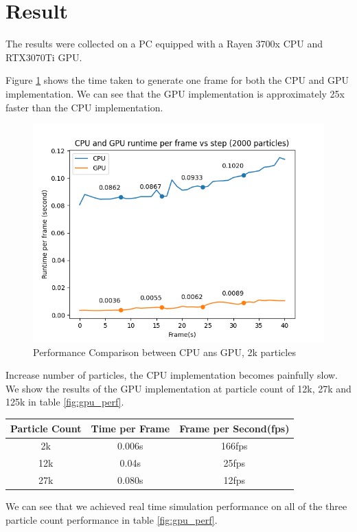 \documentclass[sigconf]{acmart}
\begin{document}
\section{Result}
The results were collected on a PC equipped with a Rayen 3700x CPU and RTX3070Ti GPU.

Figure \ref{fig:perf} shows the time taken to generate one frame for both the CPU and GPU implementation. We can see that the GPU implementation is approximately 25x faster than the CPU implementation.
\begin{figure}
  \centering
  \includegraphics[width=\linewidth]{image/cpu-gpu-comprasion.png}
  \caption{Performance Comparison between CPU ans GPU, 2k particles}
\label{fig:perf}
\end{figure}

Increase number of particles, the CPU implementation becomes painfully slow. We show the results of the GPU implementation at particle count of 12k, 27k and 125k in table \ref{fig:gpu_perf}.
\begin{center}
  \begin{tabular}{| c | c | c |}
    \hline
    Particle Count & Time per Frame & Frame per Second(fps)  \\
    \hline
    2k & 0.006s & 166fps \\
    \hline
    12k & 0.04s &  25fps \\
    \hline
    27k & 0.080s & 12fps \\
    \hline
  \end{tabular}
\end{center}
We can see that we achieved real time simulation performance on all of the three particle count performance in table \ref{fig:gpu_perf}.
\end{document}
